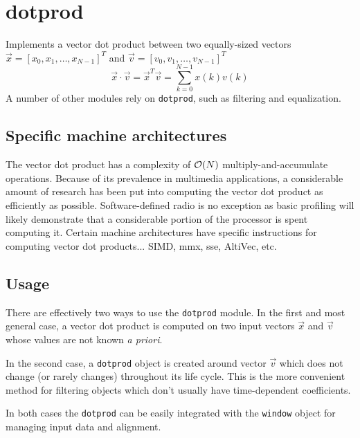 % 
%

\section{dotprod}
\label{module:dotprod}
Implements a vector dot product between two equally-sized vectors
$\vec{x} = \left[x_0,x_1,\ldots,x_{N-1}\right]^T$ and
$\vec{v} = \left[v_0,v_1,\ldots,v_{N-1}\right]^T$
\[
    \vec{x} \cdot \vec{v}   =
    \vec{x}^T \vec{v}       =
    \sum_{k=0}^{N-1}{ x(k) v(k) }
\]
A number of other modules rely on {\tt dotprod}, such as filtering and
equalization.

\subsection{Specific machine architectures}
\label{module:dotprod:arch}
The vector dot product has a complexity of $\mathcal{O}(N)$ multiply-and-accumulate
operations.
Because of its prevalence in multimedia applications, a considerable amount of
research has been put into computing the vector dot product as efficiently as
possible.
Software-defined radio is no exception as basic profiling will likely
demonstrate that a considerable portion of the processor is spent computing
it.
Certain machine architectures have specific instructions for computing vector
dot products... SIMD, mmx, sse, AltiVec, etc.

\subsection{Usage}
\label{module:dotprod:usage}
There are effectively two ways to use the {\tt dotprod} module.
In the first and most general case, a vector dot product is computed on two
input vectors $\vec{x}$ and $\vec{v}$ whose values are not known
{\it a priori}.

In the second case, a {\tt dotprod} object is created around vector $\vec{v}$
which does not change (or rarely changes) throughout its life cycle.
This is the more convenient method for filtering objects which don't usually
have time-dependent coefficients.



In both cases the {\tt dotprod} can be easily integrated with the
{\tt window} object for managing input data and alignment.
